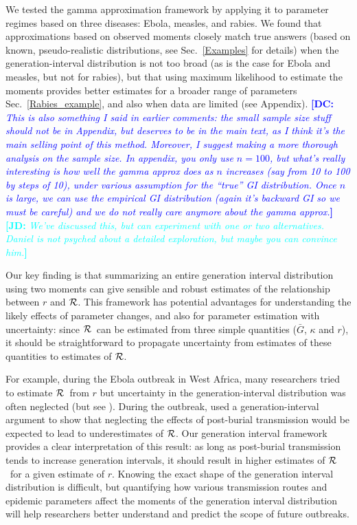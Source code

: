 \documentclass[12pt]{article}
\newcommand{\RR}{\ensuremath{{\cal R}}}
\newcommand{\sref}[1]{Sec.~\ref{#1}}
\newcommand{\comment}[3]{\textcolor{#1}{\textbf{[#2: }\textit{#3}\textbf{]}}}
\newcommand{\jd}[1]{\comment{cyan}{JD}{#1}}
\newcommand{\dc}[1]{\comment{blue}{DC}{#1}}
\begin{document}
We tested the gamma approximation framework by applying it to parameter regimes based on three diseases: Ebola, measles, and rabies. 
We found that approximations based on observed moments closely match true answers (based on known, pseudo-realistic distributions, see \sref{Examples} for details) when the generation-interval distribution is not too broad (as is the case for Ebola and measles, but not for rabies), but that using maximum likelihood to estimate the moments provides better estimates for a broader range of parameters \sref{Rabies_example}, and also when data are limited (see Appendix).
\dc{This is also something I said in earlier comments: the small sample size stuff should not be in Appendix, but deserves to be in the main text, as I think it's the main selling point of this method. Moreover, I suggest making a more thorough analysis on the sample size. In appendix, you only use $n=100$, but what's really interesting is how well  the gamma approx does as $n$ increases (say from 10 to 100 by steps of 10), under various assumption for the ``true'' GI distribution. Once $n$ is large, we can use the empirical GI distribution (again it's backward GI so we must be careful) and we do not really care anymore about the gamma approx.}
\jd{We've discussed this, but can experiment with one or two alternatives. Daniel is not psyched about a detailed exploration, but maybe you can convince him.}

Our key finding is that summarizing an entire generation interval distribution using two moments can give sensible and robust estimates of the relationship between $r$ and \RR.
This framework has potential advantages for understanding the likely effects of parameter changes, and also for parameter estimation with uncertainty: since \RR\ can be estimated from three simple quantities ($\bar G$, $\kappa$ and $r$), it should be straightforward to propagate uncertainty from estimates of these quantities to estimates of \RR.

For example, during the Ebola outbreak in West Africa, many researchers tried to estimate \RR\ from $r$ \cite{Alth14, AylwBarb14, NishChow15, RiveLofg14, 
KingDome15} but uncertainty in the generation-interval distribution was often neglected (but see \cite{TaylDush16}).  
During the outbreak, \cite{WeitDush15} used a generation-interval argument to  show that neglecting the effects of post-burial transmission would be expected to lead to underestimates of \RR.
Our generation interval framework provides a clear interpretation of this result: as long as post-burial transmission tends to increase generation intervals, it should result in higher estimates of \RR\ for a given estimate of $r$.
Knowing the exact shape of the generation interval distribution is difficult, but quantifying how various transmission routes and epidemic parameters affect the moments of the generation interval distribution will help researchers better understand and predict the scope of future outbreaks.
\end{document}
